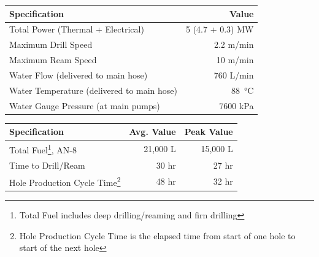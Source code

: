 \vspace{\baselineskip}

\begin{minipage}{\textwidth}
  \centering {}
  \begin{tabular}{ l  r }
 \hline
    Specification & Value \\ \hline Total Power (Thermal + Electrical)
    & 5 (4.7 + 0.3) MW \\ Maximum Drill Speed & 2.2 m/min \\ Maximum Ream
    Speed & 10 m/min \\ Water Flow (delivered to main hose) & 760 L/min
    \\ Water Temperature (delivered to main hose) & \SI{88}{\celsius}
    \\ Water Gauge Pressure (at main pumps) & 7600 kPa\\
 \hline
  \end{tabular} 
  \label{tab:ehwd_system}
\end{minipage}
\vspace{\baselineskip}

\begin{minipage}{\textwidth}
  \centering {}
  \begin{tabular}{ l  r  r }
\hline
    Specification & Avg. Value & Peak Value\\ 
\hline 
Total Fuel\footnote{Total Fuel includes deep drilling/reaming and firn
      drilling}, AN-8 & 21,000 L & 15,000 L \\ Time to Drill/Ream & 30 hr&
    27 hr \\ Hole Production Cycle Time\footnote{Hole Production Cycle Time
      is the elapsed time from start of one hole to start of the next hole}
    & 48 hr & 32 hr \\
\hline
    \end{tabular}
  
  \label{tab:ehwd_system_peak}
\end{minipage}
\vspace{\baselineskip}

